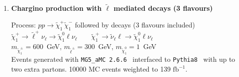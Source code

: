 \documentclass[10pt,fleqn]{article}
\newcommand{\ifb}{$\mathrm{fb}^{-1}$}
\begin{document}
\begin{enumerate}
\item{\bf Chargino production with $\tilde{\ell}$ mediated decays (3 flavours)}

 Process: $ p p \to \tilde{\chi}^+_1 \tilde{\chi}^-_1$ followed by decays (3 flavours included)\\
 $\tilde{\chi}^+_1 \to \tilde{\ell}^+ \nu_\ell \to \tilde{\chi}^0_1 \ell \nu_\ell \qquad \tilde{\chi}^+_1 \to \tilde{\nu}_\ell \ell \to \tilde{\chi}^0_1 \ell \nu_\ell $\\
 $m_{\tilde{\chi}^\pm_1} = 600$~GeV, $m_{\tilde{\ell}^\pm} = 300$~GeV,  $m_{\tilde{\chi}_1^0} = 1$~GeV\\
 Events generated with \texttt{MG5\_aMC 2.6.6}~\cite{Alwall:2014hca} interfaced to \texttt{Pythia8}~\cite{Sjostrand:2007gs} with up to two extra partons.
 10000 MC events weighted to 139 \ifb. 
 

\end{enumerate}
\end{document}
